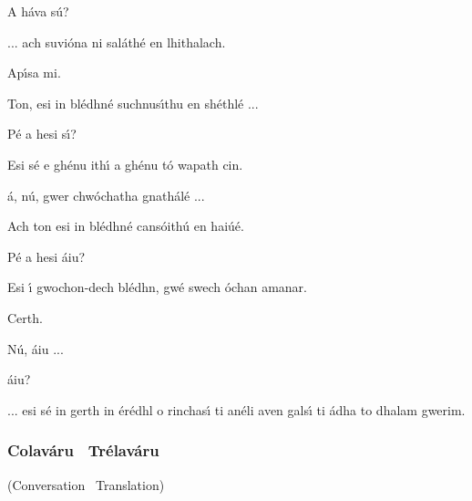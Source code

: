 \begin{leftbubbles}A h\'{a}va s\'{u}?\end{leftbubbles}
\begin{rightbubbles}... ach suvi\'{o}na ni sal\'{a}th\'{e} en lhithalach.\end{rightbubbles}
\begin{leftbubbles}Ap\'{\i}sa mi.\end{leftbubbles}
\begin{rightbubbles}Ton, esi in bl\'{e}dhn\'{e} suchnus\'{\i}thu en sh\'{e}thl\'{e} ...\end{rightbubbles}
\begin{leftbubbles}P\'{e} a hesi s\'{\i}?\end{leftbubbles}
\begin{rightbubbles}Esi s\'{e} e gh\'{e}nu ith\'{\i} a gh\'{e}nu t\'{o} wapath cin.\end{rightbubbles}
\begin{leftbubbles}\'{a}, n\'{u}, gwer chw\'{o}chatha gnath\'{a}l\'{e} ...\end{leftbubbles}
\begin{rightbubbles}Ach ton esi in bl\'{e}dhn\'{e} cans\'{o}ith\'{u} en hai\'{u}\'{e}.\end{rightbubbles}
\begin{leftbubbles}P\'{e} a hesi \'{a}iu?\end{leftbubbles}
\begin{rightbubbles}Esi \'{\i} gwochon-dech bl\'{e}dhn, gw\'{e} swech \'{o}chan amanar.\end{rightbubbles}
\begin{leftbubbles}Certh.\end{leftbubbles}
\begin{rightbubbles}N\'{u}, \'{a}iu ...\end{rightbubbles}
\begin{leftbubbles}\'{a}iu?\end{leftbubbles}
\begin{rightbubbles}... esi s\'{e} in gerth in \'{e}r\'{e}dhl o rinchas\'{\i} ti an\'{e}li aven gals\'{\i} ti \'{a}dha to dhalam gwerim.\end{rightbubbles}
\endgroup

\newpage
\subsubsection{Colav\'{a}ru \textendash\ Tr\'{e}lav\'{a}ru}
(Conversation \textendash\ Translation)\\


